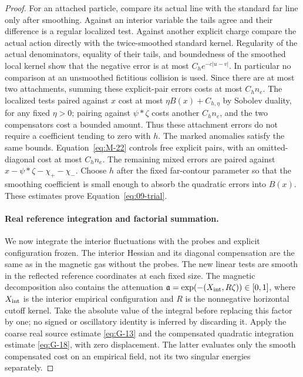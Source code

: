 \begin{proof}
For an attached particle, compare its actual line with the standard far
line only after smoothing.  Against an interior variable the tails
agree and their difference is a regular localized test.  Against
another explicit charge compare the actual action directly with the
twice-smoothed standard kernel.  Regularity of the actual denominators,
equality of their tails, and boundedness of the smoothed local kernel
show that the negative error is at most
$C_h e^{-c|u-v|}$.  In particular no comparison at an unsmoothed
fictitious collision is used.  Since there are at most two attachments,
summing these explicit-pair errors costs at most $C_h n_e$.
The localized tests paired against $x$ cost at most
$\eta B(x)+C_{h,\eta}$ by Sobolev duality, for any fixed $\eta>0$;
pairing against $\psi*\zeta$ costs another $C_h n_e$, and the two
compensators cost a bounded amount.  Thus these attachment errors do
not require a coefficient tending to zero with $h$.
The marked anomalies satisfy the same bounds.
Equation~\eqref{eq:M-22} controls free explicit pairs, with
an omitted-diagonal cost at most $C_h n_e$.  The remaining mixed
errors are paired against $x-\psi*\zeta-\chi_+-\chi_-$.
Choose $h$ after the fixed far-contour parameter so that the smoothing
coefficient is small enough to absorb the quadratic errors into
$B(x)$.  These estimates prove Equation~\eqref{eq:09-trial}.

\paragraph{Real reference integration and factorial summation.}
We now integrate the interior fluctuations with the probes and explicit
configuration frozen.  The interior Hessian and its diagonal compensation
are the same as in the magnetic gas without the probes.  The new linear
tests are smooth in the reflected reference coordinates at each fixed
size.  The magnetic decomposition also contains the attenuation
$\mathfrak a=\exp(-(X_{\rm int},R\zeta))\in[0,1]$, where
$X_{\rm int}$ is the interior empirical configuration and $R$ is
the nonnegative horizontal cutoff kernel.  Take the absolute value
of the integral before replacing this factor by one; no signed or
oscillatory identity is inferred by discarding it.  Apply the coarse
real source estimate
\eqref{eq:G-13} and the compensated quadratic integration estimate
\eqref{eq:G-18}, with zero displacement.  The latter evaluates only
the smooth compensated cost on an empirical field, not its two singular
energies separately.


\end{proof}
